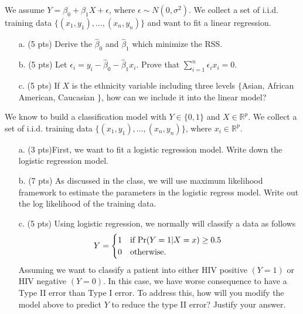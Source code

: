 \documentclass[11pt,letter]{exam}
\begin{document}
\begin{questions}
\newpage

\item  We assume $Y = \beta_0 + \beta_1 X + \epsilon$, where $\epsilon \sim N(0, \sigma^2)$. We collect a set of i.i.d. training data $\{(x_1, y_1), \ldots, (x_n, y_n) \}$ and want to fit a linear regression.
	\begin{itemize}
	\item[a.] (5 pts) Derive the $\hat{\beta}_0$ and $\hat{\beta}_1$ which minimize the RSS.
	\item[b.] (5 pts) Let $\epsilon_i = y_i - \hat{\beta}_0 - \hat{\beta}_1 x_i$. Prove that $\sum_{i = 1}^n \epsilon_i x_i = 0$. 
	\item[c.] (5 pts) If $X$ is  the ethnicity variable including three levels $\{$Asian, African American, Caucasian    $\}$, how can we include it into the linear model?
	\end{itemize}
\newpage
	 \item We know to build a classification model with $Y \in \{0, 1 \}$  and $X \in \mathbb{R}^p$. We collect a set of i.i.d. training data $\{(x_1, y_1), \ldots, (x_n, y_n) \}$, where $x_i \in \mathbb{R}^p$. 
\begin{enumerate}
\item[a.] (3 pts)First, we want to fit a logistic regression model. Write down the logistic regression model. \\

\item[b.] (7 pts) As discussed in the class, we will use maximum likelihood framework to estimate the parameters in the logistic regress model. Write out the log likelihood of the training data.
\item[c.] (5 pts) Using logistic regression, we normally will classify a data as follows
\begin{equation} \notag
  Y =
    \begin{cases}
      1 & \text{if Pr$(Y = 1 | X = x) \geq 0.5$ }\\
      0 & \text{otherwise}.
    \end{cases}     
\end{equation}
Assuming we want to classify a patient into either HIV positive $(Y = 1)$ or HIV negative $(Y = 0)$. In this case, we have worse consequence to have a Type II error than Type I error. To address this, how will you modify the model above to predict $Y$ to reduce the type II error? Justify your answer.


\end{enumerate}
\end{questions}
\end{document}
